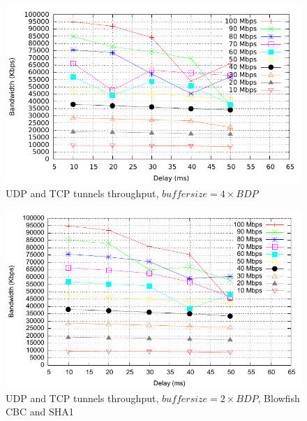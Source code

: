 \begin{figure}
  \centering
  \includegraphics[width=\textwidth]{img/test-mptcp-4}
  \caption{UDP and TCP tunnels throughput, $buffer size = 4 \times BDP$}
  \label{fig:mptcp-4}
\end{figure}

\begin{figure}
  \centering
  \includegraphics[width=\textwidth]{img/test-mptcp-2-crypto}
  \caption{UDP and TCP tunnels throughput, $buffer size = 2 \times BDP$, Blowfish CBC and SHA1}
  \label{fig:mptcp-4}
\end{figure}

